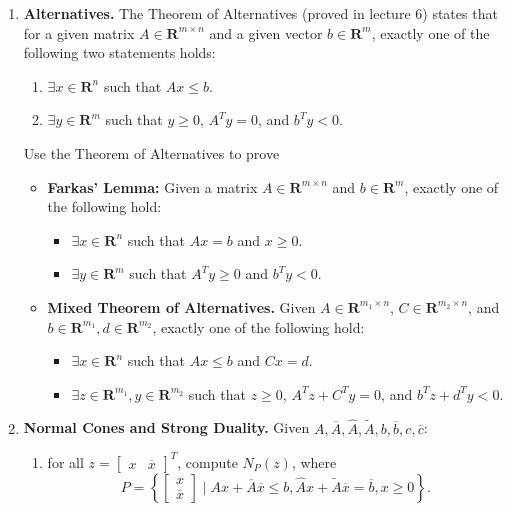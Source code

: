 \documentclass[11pt]{article}
\newcommand{\RR}{\mathbf{R}}
\begin{document}

\begin{enumerate}
\item \textbf{Alternatives.} The Theorem of Alternatives (proved in lecture 6) states that for a given matrix $A \in \RR^{m\times n}$ and a given vector $b \in \RR^m$, exactly one of the following two statements holds:
\begin{enumerate}
\item $\exists x \in \RR^n$ such that $ Ax \leq b$.
\item $\exists y \in \RR^m$ such that $y \geq 0$, $A^T y = 0$, and $b^T y < 0$.
\end{enumerate}
Use the Theorem of Alternatives to prove
\begin{itemize}
\item \textbf{Farkas' Lemma:} Given a matrix $A \in \RR^{ m\times n}$ and $b \in \RR^m$, exactly one of the following hold:
\begin{itemize}
\item $\exists x \in \RR^n$ such that $Ax = b$ and $x \geq 0$.
\item $\exists y \in \RR^m$ such that $A^T y \geq 0$ and $b^T y < 0$.
\end{itemize}
\item \textbf{Mixed Theorem of Alternatives.} Given $A \in \RR^{ m_1 \times n}$, $C \in \RR^{m_2 \times n}$, and $b \in \RR^{m_1}, d \in \RR^{m_2}$, exactly one of the following hold:
\begin{itemize}
\item $\exists x\in \RR^n$ such that $Ax \leq b$ and $Cx = d$.
\item $\exists z \in\RR^{m_1}, y \in \RR^{m_2}$ such that $z \geq 0$, $A^Tz + C^Ty = 0$, and $b^T z + d^Ty < 0$.
\end{itemize}
\end{itemize}
\item \textbf{Normal Cones and Strong Duality.} Given $A, \overline{A}, \hat{A}, \widetilde{A}, b, \overline{b}, c, \overline{c}$:
\begin{enumerate}
\item for all $z = \begin{bmatrix} x & \overline{x}\end{bmatrix}^T$, compute $N_{P}(z)$, where 
$$
P = \left\{\begin{bmatrix} x \\ \overline{x}\end{bmatrix} \mid Ax + \overline{A}\overline{x} \leq b, \hat{A}x + \widetilde{A}\overline{x} = \overline{b}, x \geq 0\right\}. 
$$
\end{enumerate}
\end{enumerate}
\end{document}
